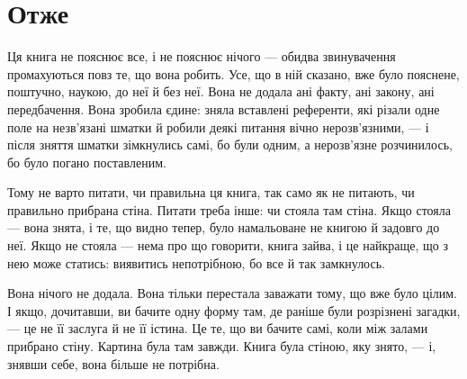 \documentclass[12pt, a4paper, openany]{book}
\begin{document}
\section{Отже}

Ця книга не пояснює все, і не пояснює нічого --- обидва звинувачення промахуються повз те, що вона робить. Усе, що в ній сказано, вже було пояснене, поштучно, наукою, до неї й без неї. Вона не додала ані факту, ані закону, ані передбачення. Вона зробила єдине: зняла вставлені референти, які різали одне поле на незв'язані шматки й робили деякі питання вічно нерозв'язними, --- і після зняття шматки зімкнулись самі, бо були одним, а нерозв'язне розчинилось, бо було погано поставленим.

Тому не варто питати, чи правильна ця книга, так само як не питають, чи правильно прибрана стіна. Питати треба інше: чи стояла там стіна. Якщо стояла --- вона знята, і те, що видно тепер, було намальоване не книгою й задовго до неї. Якщо не стояла --- нема про що говорити, книга зайва, і це найкраще, що з нею може статись: виявитись непотрібною, бо все й так замкнулось.

Вона нічого не додала. Вона тільки перестала заважати тому, що вже було цілим. І якщо, дочитавши, ви бачите одну форму там, де раніше були розрізнені загадки, --- це не її заслуга й не її істина. Це те, що ви бачите самі, коли між залами прибрано стіну. Картина була там завжди. Книга була стіною, яку знято, --- і, знявши себе, вона більше не потрібна.
\end{document}

